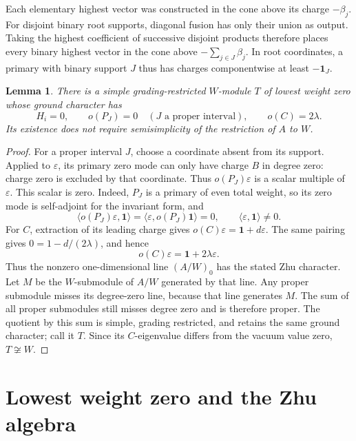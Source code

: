 \documentclass[11pt,a4paper]{article}
\numberwithin{equation}{section}
\newtheorem{lemma}[theorem]{Lemma}
\theoremstyle{definition}\newtheorem{definition}[theorem]{Definition}
\theoremstyle{remark}\newtheorem{remark}[theorem]{Remark}
\begin{document}
Each elementary highest vector was constructed in the cone above
its charge $-\beta_j$.  For disjoint binary root supports, diagonal
fusion has only their union as output.  Taking the highest
coefficient of successive disjoint products therefore places every
binary highest vector in the cone above
$-\sum_{j\in J}\beta_j$.  In root coordinates, a primary with binary
support $J$ thus has charges componentwise at least $-\mathbf1_J$.

\begin{lemma}\label{neutral:lem:second-ground-character}
There is a simple grading-restricted $W$-module $T$ of lowest weight
zero whose ground character has
\[
 H_i=0,\qquad o(P_J)=0\quad(J\text{ a proper interval}),
                     \qquad o(C)=2\lambda.
\]
Its existence does not require semisimplicity of the restriction of
$A$ to $W$.
\end{lemma}

\begin{proof}
For a proper interval $J$, choose a coordinate absent from its
support.  Applied to $\varepsilon$, its primary zero mode can only
have charge $B$ in degree zero: charge zero is excluded by that
coordinate.  Thus $o(P_J)\varepsilon$ is a scalar multiple of
$\varepsilon$.  This scalar is zero.  Indeed, $P_J$ is a primary of
even total weight, so its zero mode is self-adjoint for the invariant
form, and
\[
 \langle o(P_J)\varepsilon,\mathbf1\rangle
       =\langle\varepsilon,o(P_J)\mathbf1\rangle=0,
                     \qquad\langle\varepsilon,\mathbf1\rangle\ne0.
\]
For $C$, extraction of its leading charge gives
$o(C)\varepsilon=\mathbf1+d\varepsilon$.  The same pairing gives
$0=1-d/(2\lambda)$, and hence
\[
             o(C)\varepsilon=\mathbf1+2\lambda\varepsilon.
\]
Thus the nonzero one-dimensional line $(A/W)_0$ has the stated Zhu
character.  Let $M$ be the $W$-submodule of $A/W$ generated by that
line.  Any proper submodule misses its degree-zero line, because that
line generates $M$.  The sum of all proper submodules still misses
degree zero and is therefore proper.  The quotient by this sum is
simple, grading restricted, and retains the same ground character;
call it $T$.  Since its $C$-eigenvalue differs from the vacuum value
zero, $T\not\cong W$.
\end{proof}



\section{Lowest weight zero and the Zhu algebra}
\label{r:sec:h0}
\end{document}
